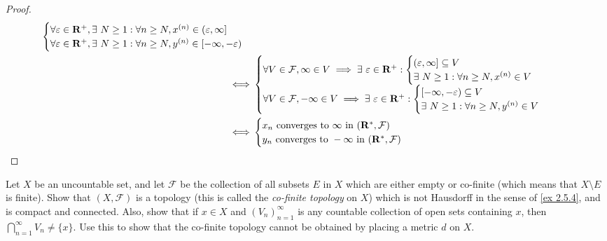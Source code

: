 \begin{proof}
\begin{align*}
\begin{cases}
             \forall \varepsilon \in \R^+, \exists\ N \geq 1 : \forall n \geq N, x^{(n)} \in (\varepsilon, \infty] \\
             \forall \varepsilon \in \R^+, \exists\ N \geq 1 : \forall n \geq N, y^{(n)} \in [-\infty, -\varepsilon)
           \end{cases} \\
    \iff & \begin{cases}
             \forall V \in \mathcal{F}, \infty \in V \implies \exists\ \varepsilon \in \R^+ : \begin{cases}
                                                                                         (\varepsilon, \infty] \subseteq V \\
                                                                                         \exists\ N \geq 1 : \forall n \geq N, x^{(n)} \in V
                                                                                       \end{cases} \\
             \forall V \in \mathcal{F}, -\infty \in V \implies \exists\ \varepsilon \in \R^+ : \begin{cases}
                                                                                          [-\infty, -\varepsilon) \subseteq V \\
                                                                                          \exists\ N \geq 1 : \forall n \geq N, y^{(n)} \in V
                                                                                        \end{cases}
           \end{cases}                   \\
    \iff & \begin{cases}
             x_n \text{ converges to } \infty \text{ in } (\R^*, \mathcal{F})  \\
             y_n \text{ converges to } -\infty \text{ in } (\R^*, \mathcal{F}) \\
           \end{cases}
  \end{align*}
\end{proof}

\begin{exercise}\label{ex 2.5.6}
  Let \(X\) be an uncountable set, and let \(\mathcal{F}\) be the collection of all subsets \(E\) in \(X\) which are either empty or co-finite (which means that \(X \setminus E\) is finite).
  Show that \((X, \mathcal{F})\) is a topology (this is called the \emph{co-finite topology} on \(X\)) which is not Hausdorff in the sense of \cref{ex 2.5.4}, and is compact and connected.
  Also, show that if \(x \in X\) and \((V_n)_{n = 1}^\infty\) is any countable collection of open sets containing \(x\), then \(\bigcap_{n = 1}^\infty V_n \neq \{x\}\).
  Use this to show that the co-finite topology cannot be obtained by placing a metric \(d\) on \(X\).
\end{exercise}

